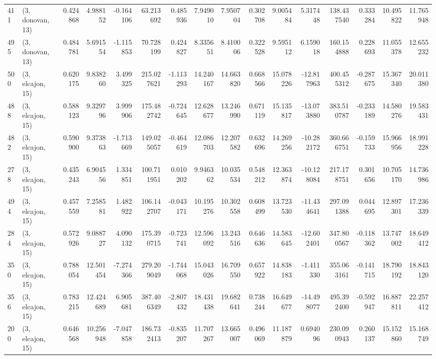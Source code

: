 \begin{tabular}{llrrrrrrrrrrrrrr}
411 &  (3, donovan, 13) &   0.424868 &   4.988152 &  -0.164106 &    63.213692 &   0.485936 &   7.949010 &   7.950704 &  0.302708 &   9.005484 &   5.317448 &    138.437540 &   0.333284 &   10.495822 &   11.765948 \\
495 &  (3, donovan, 13) &   0.484781 &   5.691554 &  -1.115853 &    70.728199 &   0.424827 &   8.335651 &   8.410006 &  0.322528 &   9.595112 &   6.159018 &    160.154888 &   0.228693 &   11.055378 &   12.655232 \\
500 &  (3, elcajon, 15) &   0.620175 &   9.838260 &   3.499325 &   215.027621 &  -1.113293 &  14.240167 &  14.663820 &  0.668566 &  15.078226 & -12.817963 &    400.455312 &  -0.287675 &   15.367340 &   20.011380 \\
488 &  (3, elcajon, 15) &   0.588123 &   9.329796 &   3.999906 &   175.482742 &  -0.724645 &  12.628677 &  13.246990 &  0.671119 &  15.135817 & -13.073880 &    383.510787 &  -0.233189 &   14.580276 &   19.583431 \\
482 &  (3, elcajon, 15) &   0.590900 &   9.373863 &  -1.713669 &   149.025057 &  -0.464619 &  12.086703 &  12.207582 &  0.632696 &  14.269256 & -10.282172 &    360.666751 &  -0.159733 &   15.966956 &   18.991228 \\
278 &  (3, elcajon, 15) &   0.435243 &   6.904556 &   1.334851 &   100.711951 &   0.010202 &   9.946362 &  10.035534 &  0.548212 &  12.363874 & -10.128084 &    217.178751 &   0.301656 &   10.705170 &   14.736986 \\
494 &  (3, elcajon, 15) &   0.457559 &   7.258581 &   1.482922 &   106.142707 &  -0.043171 &  10.195276 &  10.302558 &  0.608499 &  13.723530 & -11.434641 &    297.091388 &   0.044695 &   12.897301 &   17.236339 \\
284 &  (3, elcajon, 15) &   0.572926 &   9.088727 &   4.090132 &   175.390715 &  -0.723741 &  12.596092 &  13.243516 &  0.646636 &  14.583645 & -12.602401 &    347.800567 &  -0.118362 &   13.747002 &   18.649412 \\
350 &  (3, elcajon, 15) &   0.788054 &  12.501454 &  -7.274366 &   279.209049 &  -1.744068 &  15.043026 &  16.709550 &  0.657922 &  14.838183 &  -1.411330 &    355.063161 &  -0.141715 &   18.790192 &   18.843120 \\
356 &  (3, elcajon, 15) &   0.783215 &  12.424689 &   6.905681 &   387.406349 &  -2.807432 &  18.431438 &  19.682641 &  0.738244 &  16.649677 & -14.498077 &    495.392400 &  -0.592947 &   16.887811 &   22.257412 \\
200 &  (3, elcajon, 15) &   0.646568 &  10.256948 &  -7.047858 &   186.732413 &  -0.835207 &  11.707267 &  13.665007 &  0.496069 &  11.187879 &   0.694096 &    230.090943 &   0.260137 &   15.152860 &   15.168749 \\

\end{tabular}
